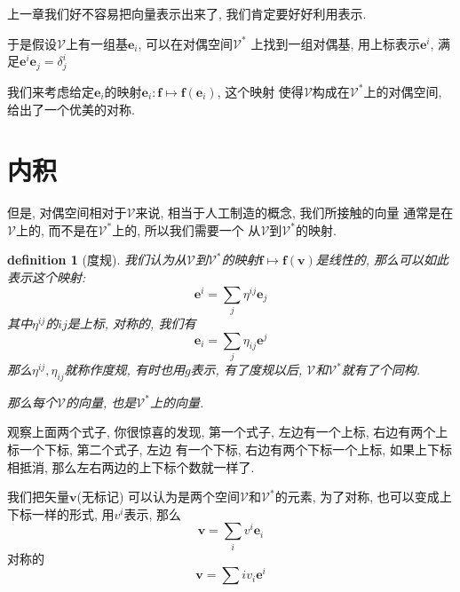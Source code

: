 \documentclass[12pt]{ctexbook}
\newtheorem{definition}{definition}
\numberwithin{definition}{section}
\numberwithin{theorem}{section}
\numberwithin{exercise}{section}
\numberwithin{example}{section}
\numberwithin{lemma}{section}
\begin{document}
    上一章我们好不容易把向量表示出来了, 我们肯定要好好利用表示.

    于是假设\(\mathcal{V}\)上有一组基\(\boldsymbol{e}_i\), 可以在对偶空间\(\mathcal{V}^*\)
    上找到一组对偶基, 用上标表示\(\boldsymbol{e}^i\), 满足\(\boldsymbol{e}^i\boldsymbol{e}_j = \delta^i_j\)\footnotemark{}

    我们来考虑给定\(\boldsymbol{e}_i\)的映射\(\boldsymbol{e}_i : \boldsymbol{f} \mapsto \boldsymbol{f}(\boldsymbol{e}_i)\), 这个映射
    使得\(\mathcal{V}\)构成在\(\mathcal{V}^*\)上的对偶空间, 给出了一个优美的对称.

    \section{内积}

    但是, 对偶空间相对于\(\mathcal{V}\)来说, 相当于人工制造的概念, 我们所接触的向量
    通常是在\(\mathcal{V}\)上的, 而不是在\(\mathcal{V}^*\)上的, 所以我们需要一个
    从\(\mathcal{V}\)到\(\mathcal{V}^*\)的映射.

    \begin{definition}
        [度规] 我们认为从\(\mathcal{V}\)到\(\mathcal{V}^*\)的映射\(\boldsymbol{f} \mapsto \boldsymbol{f}(\boldsymbol{v})\)是线性的, 那么可以如此表示这个映射:
        \begin{equation}
            \boldsymbol{e}^i = \sum_{j} \eta^{ij} \boldsymbol{e}_j
        \end{equation}
        其中\(\eta^{ij}\)的\(ij\)是上标, 对称的, 我们有
        \begin{equation}
            \boldsymbol{e}_i = \sum_{j} \eta_{ij} \boldsymbol{e}^j
        \end{equation}
        那么\(\eta^{ij},\eta_{ij}\)就称作度规, 有时也用\(g\)表示, 有了度规以后, \(\mathcal{V}\)和\(\mathcal{V}^*\)就有了个同构.

        那么每个\(\mathcal{V}\)的向量, 也是\(\mathcal{V}^*\)上的向量.
    \end{definition}

    观察上面两个式子, 你很惊喜的发现, 第一个式子, 左边有一个上标, 右边有两个上标一个下标, 第二个式子, 左边
    有一个下标, 右边有两个下标一个上标, 如果上下标相抵消, 那么左右两边的上下标个数就一样了.

    我们把矢量\(\boldsymbol{v}\)(无标记) 可以认为是两个空间\(\mathcal{V}\)和\(\mathcal{V}^*\)的元素, 为了对称, 也可以变成上下标一样的形式, 用\(v^i\)表示, 那么
    \begin{equation}
        \boldsymbol{v} = \sum_{i} v^i \boldsymbol{e}_i
    \end{equation}
    对称的
    \begin{equation}
        \boldsymbol{v} = \sum{i} v_i \boldsymbol{e}^i
    \end{equation}
\end{document}
